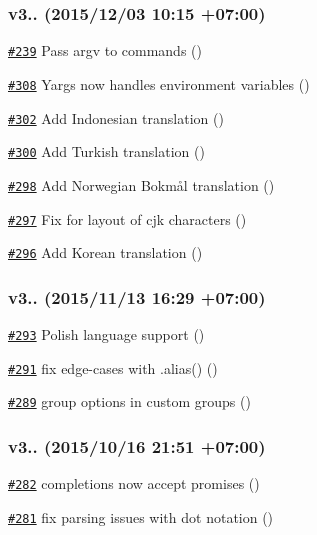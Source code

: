 \subsubsection*{v3.. (2015/12/03 10\+:15 +07\+:00)}


\begin{DoxyItemize}
\item \href{https://github.com/bcoe/yargs/pull/239}{\tt \#239} Pass argv to commands ()
\item \href{https://github.com/bcoe/yargs/pull/308}{\tt \#308} Yargs now handles environment variables ()
\item \href{https://github.com/bcoe/yargs/pull/302}{\tt \#302} Add Indonesian translation ()
\item \href{https://github.com/bcoe/yargs/pull/300}{\tt \#300} Add Turkish translation ()
\item \href{https://github.com/bcoe/yargs/pull/298}{\tt \#298} Add Norwegian Bokmål translation ()
\item \href{https://github.com/bcoe/yargs/pull/297}{\tt \#297} Fix for layout of cjk characters ()
\item \href{https://github.com/bcoe/yargs/pull/296}{\tt \#296} Add Korean translation ()
\end{DoxyItemize}

\subsubsection*{v3.. (2015/11/13 16\+:29 +07\+:00)}


\begin{DoxyItemize}
\item \href{https://github.com/bcoe/yargs/pull/293}{\tt \#293} Polish language support ()
\item \href{https://github.com/bcoe/yargs/pull/291}{\tt \#291} fix edge-\/cases with {\ttfamily .alias()} ()
\item \href{https://github.com/bcoe/yargs/pull/289}{\tt \#289} group options in custom groups ()
\end{DoxyItemize}

\subsubsection*{v3.. (2015/10/16 21\+:51 +07\+:00)}


\begin{DoxyItemize}
\item \href{https://github.com/bcoe/yargs/pull/282}{\tt \#282} completions now accept promises ()
\item \href{https://github.com/bcoe/yargs/pull/281}{\tt \#281} fix parsing issues with dot notation ()
\end{DoxyItemize}

